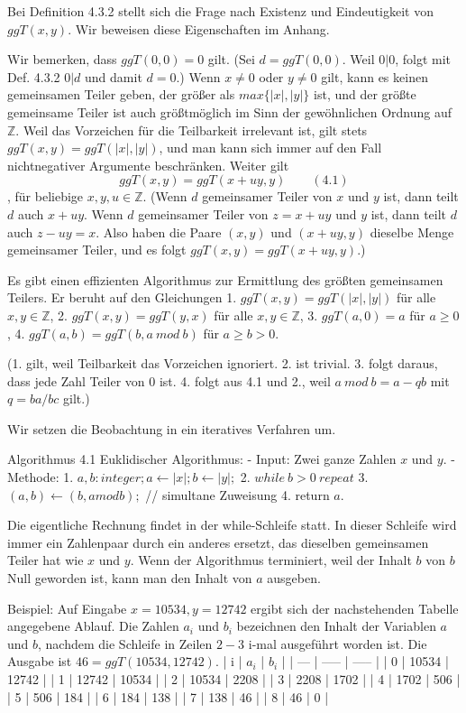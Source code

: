 \documentclass[a4paper]{article}
\begin{document}
\begin{multicols}{3}
        Bei Definition 4.3.2 stellt sich die Frage nach Existenz und Eindeutigkeit von $ggT(x,y)$. Wir beweisen diese Eigenschaften im Anhang.

        Wir bemerken, dass $ggT(0,0) = 0$ gilt. (Sei $d = ggT(0,0)$. Weil $0|0$, folgt mit Def. 4.3.2 $0|d$ und damit $d=0$.) Wenn $x\not= 0$ oder $y\not= 0$ gilt, kann es keinen gemeinsamen Teiler geben, der größer als $max\{|x|,|y|\}$ ist, und der größte gemeinsame Teiler ist auch größtmöglich im Sinn der gewöhnlichen Ordnung auf $\mathbb{Z}$. Weil das Vorzeichen für die Teilbarkeit irrelevant ist, gilt stets $ggT(x,y) = ggT(|x|,|y|)$, und man kann sich immer auf den Fall nichtnegativer Argumente beschränken. Weiter gilt $$ggT(x,y) = ggT(x+uy,y) \quad\quad(4.1)$$, für beliebige $x,y,u\in\mathbb{Z}$. (Wenn $d$ gemeinsamer Teiler von $x$ und $y$ ist, dann teilt $d$ auch $x+uy$. Wenn $d$ gemeinsamer Teiler von $z=x+uy$ und $y$ ist, dann teilt $d$ auch $z-uy =x$. Also haben die Paare $(x,y)$ und $(x+uy,y)$ dieselbe Menge gemeinsamer Teiler, und es folgt $ggT(x,y) = ggT(x+uy,y)$.)

        Es gibt einen effizienten Algorithmus zur Ermittlung des größten gemeinsamen Teilers. Er beruht auf den Gleichungen
        1. $ggT(x,y) = ggT(|x|,|y|)$ für alle $x,y\in\mathbb{Z}$,
        2. $ggT(x,y) = ggT(y,x)$ für alle $x,y\in\mathbb{Z}$,
        3. $ggT(a,0) =a$ für $a\geq 0$,
        4. $ggT(a,b) = ggT(b,a\ mod\ b)$ für $a\geq b >0$.

        (1. gilt, weil Teilbarkeit das Vorzeichen ignoriert. 2. ist trivial. 3. folgt daraus, dass jede Zahl Teiler von $0$ ist. 4. folgt aus 4.1 und 2., weil $a\ mod\ b=a-qb$ mit $q=ba/bc$ gilt.)

        Wir setzen die Beobachtung in ein iteratives Verfahren um.

        Algorithmus 4.1 Euklidischer Algorithmus:
        - Input: Zwei ganze Zahlen $x$ und $y$.
        - Methode:
        1. $a,b:integer;a\leftarrow |x|;b\leftarrow |y|;$
        2. $while\ b> 0\ repeat$
        3. $(a,b)\leftarrow (b,amodb);$ // simultane Zuweisung
        4. return $a$.

        Die eigentliche Rechnung findet in der while-Schleife statt. In dieser Schleife wird immer ein Zahlenpaar durch ein anderes ersetzt, das dieselben gemeinsamen Teiler hat wie $x$ und $y$. Wenn der Algorithmus terminiert, weil der Inhalt $b$ von $b$ Null geworden ist, kann man den Inhalt von $a$ ausgeben.

        Beispiel: Auf Eingabe $x=10534, y=12742$ ergibt sich der nachstehenden Tabelle angegebene Ablauf. Die Zahlen $a_i$ und $b_i$ bezeichnen den Inhalt der Variablen $a$ und $b$, nachdem die Schleife in Zeilen $2-3$ i-mal ausgeführt worden ist. Die Ausgabe ist $46 = ggT(10534,12742)$.
        | i   | $a_i$ | $b_i$ |
        | --- | ----- | ----- |
        | 0   | 10534 | 12742 |
        | 1   | 12742 | 10534 |
        | 2   | 10534 | 2208  |
        | 3   | 2208  | 1702  |
        | 4   | 1702  | 506   |
        | 5   | 506   | 184   |
        | 6   | 184   | 138   |
        | 7   | 138   | 46    |
        | 8   | 46    | 0     |



\end{multicols}
\end{document}
